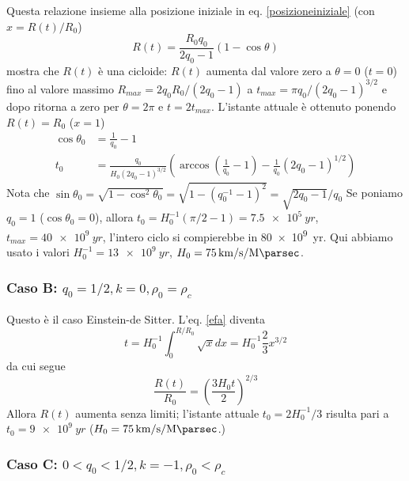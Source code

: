 Questa relazione insieme alla posizione iniziale in eq. \eqref{posizioneiniziale}
(con $x=R(t)/R_0$)
\begin{equation}
  R(t)= \frac {R_0 q_0} {2q_0-1} (1-\cos \theta)
\end{equation}
mostra che $R(t)$ è una cicloide: $R(t)$ aumenta dal valore zero a $\theta=0$
($t=0$) fino al valore massimo $R_{max}= {2 q_0 R_0 }/({2q_0-1})$ a
$t_{max}= \pi q_0/(2q_0-1)^{3/2}$ e dopo ritorna a zero per $\theta =2 \pi$ e
$t=2t_{max}$.  L'istante attuale è ottenuto ponendo $R(t)=R_0$ ($x=1$)
\begin{subequations}
  \begin{align}
    \cos\theta_0 &= \frac {1} {q_0} -1 \\
    t_0 &= \frac {q_0}{H_0 (2q_0-1)^{3/2}} \left(\arccos(\frac {1}{q_0}-1) -
      \frac {1}{q_0}(2q_0-1)^{1/2} \right)
  \end{align}
\end{subequations}
Nota che
$\sin \theta_0= \sqrt{1-\cos^2\theta_0}= \sqrt{1-(q_0^{-1}-1)^2}=
{\sqrt{2q_0-1}}/{q_0}$
Se poniamo $q_0=1$ ($\cos \theta_0=0$), allora
$t_0 = H_0^{-1} (\pi /2-1) = \SI{7.5e5}{yr}$, $t_{max} = \SI{40e9}{yr}$,
l'intero ciclo si compierebbe in \SI{80e9}{yr}.  Qui abbiamo usato i valori
$H_0^{-1} = \SI{13e9}{yr}$,
$H_0 = \SI{75}{\kilo\metre \per \second \per \mega\parsec}$.

\subsubsection{Caso B: $q_0 = 1/2,  k=0, \rho_0=  \rho_c$}

Questo è il caso Einstein-de Sitter.  L'eq. \eqref{efa} diventa
\begin{equation}
  t = H_0^{-1} \int_0^{R/R_0} \sqrt x dx = H_0^{-1} \frac{2} {3} x^{3/2}
\end{equation}
da cui segue
\begin{equation}
  \frac{R(t)}{R_0} = \left( \frac {3H_0 t}{2} \right)^{2/3}
\end{equation}
Allora $R(t)$ aumenta senza limiti; l'istante attuale $t_0=2H_0^{-1}/3$ risulta
pari a $t_0= \SI{9e9}{yr}$
($H_0= \SI{75}{\kilo\metre \per \second \per \mega\parsec}$.)

\subsubsection{Caso C: $0< q_0 < 1/2,  k=-1, \rho_0 <  \rho_c$ }

